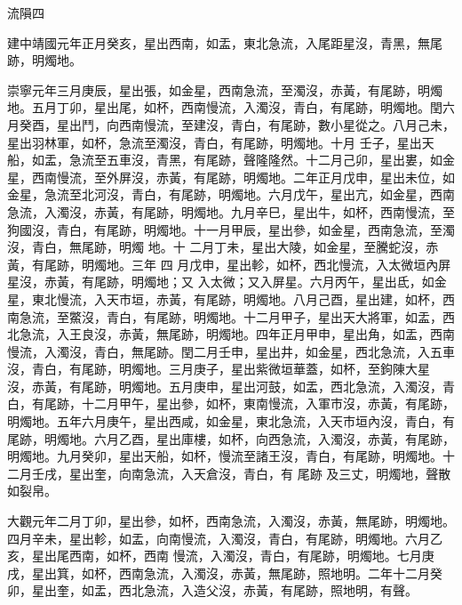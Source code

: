 
\begin{pinyinscope}

 流隕四



 建中靖國元年正月癸亥，星出西南，如盂，東北急流，入尾距星沒，青黑，無尾跡，明燭地。



 崇寧元年三月庚辰，星出張，如金星，西南急流，至濁沒，赤黃，有尾跡，明燭地。五月丁卯，星出尾，如杯，西南慢流，入濁沒，青白，有尾跡，明燭地。閏六月癸酉，星出鬥，向西南慢流，至建沒，青白，有尾跡，數小星從之。八月己未，星出羽林軍，如杯，急流至濁沒，青白，有尾跡，明燭地。十月
 壬子，星出天船，如盂，急流至五車沒，青黑，有尾跡，聲隆隆然。十二月己卯，星出婁，如金星，西南慢流，至外屏沒，赤黃，有尾跡，明燭地。二年正月戊申，星出未位，如金星，急流至北河沒，青白，有尾跡，明燭地。六月戊午，星出亢，如金星，西南急流，入濁沒，赤黃，有尾跡，明燭地。九月辛巳，星出牛，如杯，西南慢流，至狗國沒，青白，有尾跡，明燭地。十一月甲辰，星出參，如金星，西南急流，至濁沒，青白，無尾跡，明燭
 地。十
 二月丁未，星出大陵，如金星，至騰蛇沒，赤黃，有尾跡，明燭地。三年
 四
 月戊申，星出軫，如杯，西北慢流，入太微垣內屏星沒，赤黃，有尾跡，明燭地；又
 入太微；又入屏星。六月丙午，星出氐，如金星，東北慢流，入天市垣，赤黃，有尾跡，明燭地。八月己酉，星出建，如杯，西南急流，至鱉沒，青白，有尾跡，明燭地。十二月甲子，星出天大將軍，如盂，西北急流，入王良沒，赤黃，無尾跡，明燭地。四年正月甲申，星出角，如盂，西南慢流，入濁沒，青白，無尾跡。閏二月壬申，星出井，如金星，西北急流，入五車沒，青白，有尾跡，明燭地。三月庚子，星出紫微垣華蓋，如杯，至鉤陳大星
 沒，赤黃，有尾跡，明燭地。五月庚申，星出河鼓，如盂，西北急流，入濁沒，青白，有尾跡，十二月甲午，星出參，如杯，東南慢流，入軍市沒，赤黃，有尾跡，明燭地。五年六月庚午，星出西咸，如金星，東北急流，入天市垣內沒，青白，有尾跡，明燭地。六月乙酉，星出庫樓，如杯，向西急流，入濁沒，赤黃，有尾跡，明燭地。九月癸卯，星出天船，如杯，慢流至諸王沒，青白，有尾跡，明燭地。十二月壬戌，星出奎，向南急流，入天倉沒，青白，有
 尾跡
 及三丈，明燭地，聲散如裂帛。



 大觀元年二月丁卯，星出參，如杯，西南急流，入濁沒，赤黃，無尾跡，明燭地。四月辛未，星出軫，如盂，向南慢流，入濁沒，青白，有尾跡，明燭地。六月乙亥，星出尾西南，如杯，西南
 慢流，入濁沒，青白，有尾跡，明燭地。七月庚戌，星出箕，如杯，西南急流，入濁沒，赤黃，無尾跡，照地明。二年十二月癸卯，星出奎，如盂，西北急流，入造父沒，赤黃，有尾跡，照地明，有聲。




\end{pinyinscope}
